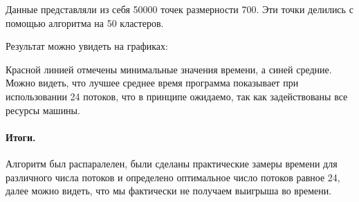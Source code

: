 \documentclass[12pt]{article}
\begin{document}
Данные представляли из себя 50000 точек размерности 700. Эти точки
делились с помощью алгоритма на 50 кластеров.

Результат можно увидеть на графиках:

\begin{center}
\end{center}

Красной линией отмечены минимальные значения времени, а синей средние.
Можно видеть, что лучшее среднее время программа показывает при использовании
24 потоков, что в принципе ожидаемо, так как задействованы все ресурсы
машины.

\paragraph{Итоги.} Алгоритм был распаралелен, были сделаны практические замеры
времени для различного числа потоков и определено оптимальное число потоков
равное 24, далее можно видеть, что мы фактически не получаем выигрыша во времени.
\end{document}
